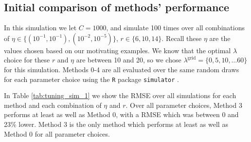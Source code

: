 \documentclass[12pt]{article}
\newcommand{\lambdagrid}{\lambda^{\text{grid}}}
\begin{document}

\subsection{Initial comparison of methods' performance}
\label{sec:tuning_simulation_1}


In this simulation we let $C = 1000$, and simulate 100 times over all combinations of $\eta \in \{(10^{-1}, 10^{-1}), (10^{-2}, 10^{-5}) \}$, $r \in \{6, 10, 14\}$.  Recall these $\eta$ are the values chosen based on our motivating examples.  We know that the optimal $\lambda$ choice for these $r$ and $\eta$ are between 10 and 20, so we chose $\lambdagrid = \{0, 5, 10, \dots 60\}$ for this simulation.  Methods 0-4 are all evaluated over the same random draws for each parameter choice using the \texttt{R}
package \texttt{simulator} \citep{Bien:2016tg}.


In Table \ref{tab:tuning_sim_1} we show the RMSE over all simulations for each method and each combination of $\eta$ and $r$.  Over all parameter choices, Method 3 performs at least as well as Method 0, with a RMSE which was between 0 and 23\% lower.  Method 3 is the only method which performs at least as well as Method 0 for all parameter choices.
\end{document}
